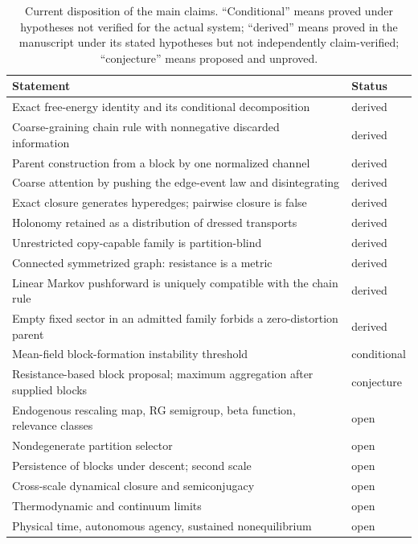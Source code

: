 \documentclass[11pt,letterpaper]{article}
\begin{document}
\begin{table}[h]
\centering
\small
\begin{tabular}{@{}p{}l@{}}
\toprule
Statement & Status \\
\midrule
Exact free-energy identity and its conditional decomposition & derived \\
Coarse-graining chain rule with nonnegative discarded information & derived \\
Parent construction from a block by one normalized channel & derived \\
Coarse attention by pushing the edge-event law and disintegrating & derived \\
Exact closure generates hyperedges; pairwise closure is false & derived \\
Holonomy retained as a distribution of dressed transports & derived \\
Unrestricted copy-capable family is partition-blind & derived \\
Connected symmetrized graph: resistance is a metric & derived \\
Linear Markov pushforward is uniquely compatible with the chain rule & derived \\
Empty fixed sector in an admitted family forbids a zero-distortion parent & derived \\
Mean-field block-formation instability threshold & conditional \\
Resistance-based block proposal; maximum aggregation after supplied blocks & conjecture \\
Endogenous rescaling map, RG semigroup, beta function, relevance classes & open \\
Nondegenerate partition selector & open \\
Persistence of blocks under descent; second scale & open \\
Cross-scale dynamical closure and semiconjugacy & open \\
Thermodynamic and continuum limits & open \\
Physical time, autonomous agency, sustained nonequilibrium & open \\
\bottomrule
\end{tabular}
\caption{Current disposition of the main claims. ``Conditional'' means proved under
hypotheses not verified for the actual system; ``derived'' means proved in the
manuscript under its stated hypotheses but not independently claim-verified;
``conjecture'' means proposed and unproved.}
\end{table}
\end{document}
